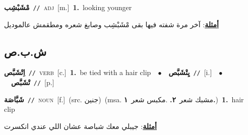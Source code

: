 \documentclass[10pt,a4paper,twoside]{article} %
\begin{document}
\begin{multicols}{2}
{{{{{{{{{{\setlength\topsep{0pt}\textbf{\foreignlanguage{arabic}{مْشَبْشِب}}\ {\color{gray}\texttt{//}\color{black}}\ \textsc{adj}\ [m.]\ \textbf{1.}~looking younger\  \begin{flushright}\color{gray}\foreignlanguage{arabic}{\textbf{\underline{\foreignlanguage{arabic}{أمثلة}}}: آخر مرة شفته فيها بقى مْشَبْشِب وصابغ شعره ومطقمش عالموديل}\end{flushright}\color{black}} \vspace{2mm}

\vspace{-3mm}
\subsection*{\color{blue}\foreignlanguage{arabic}{ش.ب.ص}\color{blue}{}} 

{\setlength\topsep{0pt}\textbf{\foreignlanguage{arabic}{اِتْشَبَّص}}\ {\color{gray}\texttt{//}\color{black}}\ \textsc{verb}\ [c.]\ \textbf{1.}~be tied with a hair clip\ \ $\bullet$\ \ \setlength\topsep{0pt}\textbf{\foreignlanguage{arabic}{يِتْشَبَّص}}\ {\color{gray}\texttt{//}\color{black}}\ [i.]\ \ $\bullet$\ \ \setlength\topsep{0pt}\textbf{\foreignlanguage{arabic}{تْشَبَّص}}\ {\color{gray}\texttt{//}\color{black}}\ [p.]\ 

{\setlength\topsep{0pt}\textbf{\foreignlanguage{arabic}{شَبَّاصَة}}\ {\color{gray}\texttt{//}\color{black}}\ \textsc{noun}\ [f.]\ (src. \color{gray}\foreignlanguage{arabic}{جنين}\color{black})\ \color{gray}(msa. \foreignlanguage{arabic}{مشبك شعر}~\foreignlanguage{arabic}{\textbf{٢.}}  .\foreignlanguage{arabic}{مكبس شعر}~\foreignlanguage{arabic}{\textbf{١.}})\color{black}\ \textbf{1.}~hair clip\  \begin{flushright}\color{gray}\foreignlanguage{arabic}{\textbf{\underline{\foreignlanguage{arabic}{أمثلة}}}: جيبلي معك شباصة عشان اللي عندي انكسرت}\end{flushright}\color{black}} \vspace{2mm}

}}}}}}}}}}
\end{multicols}
\end{document}

